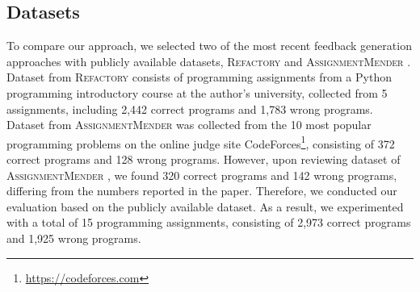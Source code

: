 \documentclass[10pt,conference]{IEEEtran}
\begin{document}
    \subsection{Datasets}
        To compare our approach, we selected two of the most recent feedback generation approaches with publicly available datasets, \textsc{Refactory} \cite{hu2019re} and \textsc{AssignmentMender} \cite{li2022generating}. Dataset from \textsc{Refactory} consists of programming assignments from a Python programming introductory course at the author's university, collected from 5 assignments, including 2,442 correct programs and 1,783 wrong programs. Dataset from \textsc{AssignmentMender} was collected from the 10 most popular programming problems on the online judge site CodeForces\footnote{\url{https://codeforces.com}}, consisting of 372 correct programs and 128 wrong programs. However, upon reviewing dataset of \textsc{AssignmentMender} \cite{ExperimentTask}, we found 320 correct programs and 142 wrong programs, differing from the numbers reported in the paper. Therefore, we conducted our evaluation based on the publicly available dataset. As a result, we experimented with a total of 15 programming assignments, consisting of 2,973 correct programs and 1,925 wrong programs.
\end{document}
